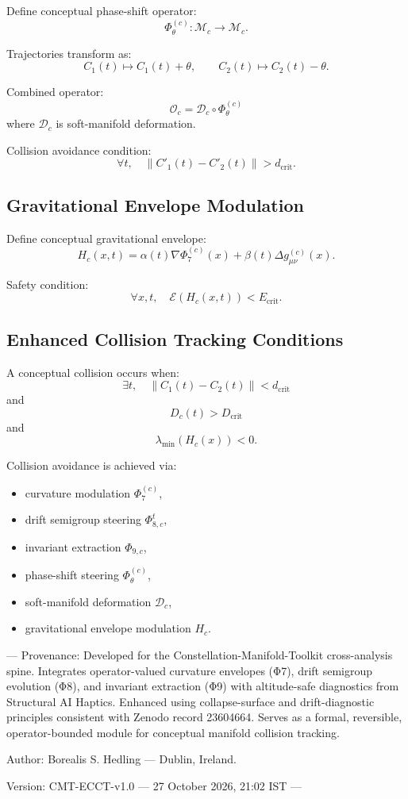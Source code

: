 Define conceptual phase-shift operator:
\[
\Phi_\theta^{(c)} : \mathcal{M}_c \to \mathcal{M}_c.
\]

Trajectories transform as:
\[
C_1(t) \mapsto C_1(t) + \theta,
\qquad
C_2(t) \mapsto C_2(t) - \theta.
\]

Combined operator:
\[
\mathcal{O}_c = \mathcal{D}_c \circ \Phi_\theta^{(c)}
\]
where $\mathcal{D}_c$ is soft-manifold deformation.

Collision avoidance condition:
\[
\forall t,\quad
\|C'_1(t) - C'_2(t)\| > d_{\text{crit}}.
\]

\subsection{Gravitational Envelope Modulation}

Define conceptual gravitational envelope:
\[
H_c(x,t)
  = \alpha(t)\nabla \Phi_7^{(c)}(x)
  + \beta(t)\Delta g^{(c)}_{\mu\nu}(x).
\]

Safety condition:
\[
\forall x,t,\quad
\mathcal{E}(H_c(x,t)) < E_{\text{crit}}.
\]

\subsection{Enhanced Collision Tracking Conditions}

A conceptual collision occurs when:
\[
\exists t,\quad
\|C_1(t) - C_2(t)\| < d_{\text{crit}}
\]
and
\[
D_c(t) > D_{\text{crit}}
\]
and
\[
\lambda_{\min}(H_c(x)) < 0.
\]

Collision avoidance is achieved via:
\begin{itemize}
  \item curvature modulation $\Phi_7^{(c)}$,
  \item drift semigroup steering $\Phi_{8,c}^t$,
  \item invariant extraction $\Phi_{9,c}$,
  \item phase-shift steering $\Phi_\theta^{(c)}$,
  \item soft-manifold deformation $\mathcal{D}_c$,
  \item gravitational envelope modulation $H_c$.
\end{itemize}


---
Provenance:
Developed for the Constellation-Manifold-Toolkit cross-analysis spine.
Integrates operator-valued curvature envelopes (Φ7), drift semigroup evolution (Φ8),
and invariant extraction (Φ9) with altitude-safe diagnostics from Structural AI Haptics.
Enhanced using collapse-surface and drift-diagnostic principles consistent with
Zenodo record 23604664. Serves as a formal, reversible, operator-bounded module
for conceptual manifold collision tracking.

Author:
Borealis S. Hedling — Dublin, Ireland.

Version:
CMT-ECCT-v1.0 — 27 October 2026, 21:02 IST
---
